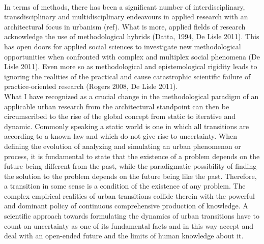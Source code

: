 \documentclass[11pt]{report}
\begin{document}
\\
In terms of methods, there has been a significant number of interdisciplinary, transdisciplinary and multidisciplinary endeavours in applied research with an architectural focus in urbanism (ref). What is more, applied fields of research acknowledge the use of methodological hybrids (Datta, 1994, De Lisle 2011). This has open doors for applied social sciences to investigate new methodological opportunities when confronted with complex and multiplex social phenomena (De Lisle 2011). Even more so as methodological and epistemological rigidity leads to ignoring the realities of the practical and cause catastrophic scientific failure of practice-oriented research (Rogers 2008, De Lisle 2011).
\\
What I have recognized as a crucial change in the methodological paradigm of an applicable urban research from the architectural standpoint can then be circumscribed to the rise of the global concept from static to iterative and dynamic. Commonly speaking a static world is one in which all transitions are according to a known law and which do not give rise to uncertainty. When defining the evolution of analyzing and simulating an urban phenomenon or process, it is fundamental to state that the existence of a problem depends on the future being different from the past, while the paradigmatic possibility of finding the solution to the problem depends on the future being like the past. Therefore, a transition in some sense is a condition of the existence of any problem. The complex empirical realities of urban transitions collide therein with the powerful and dominant policy of continuous comprehensive production of knowledge. A scientific approach towards formulating the dynamics of urban transitions have to count on uncertainty as one of its fundamental facts and in this way accept and deal with an open-ended future and the limits of human knowledge about it.
\\
\end{document}
